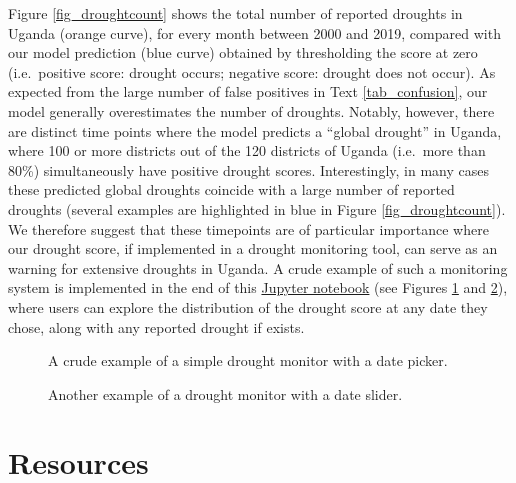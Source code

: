 \documentclass[10pt,parskip=half,
toc=sectionentrywithdots,
bibliography=totocnumbered,
captions=tableheading,numbers=noendperiod]{scrartcl}
\begin{document}
Figure \ref{fig_droughtcount} shows the total number of reported
droughts in Uganda (orange curve), for every month between 2000 and
2019, compared with our model prediction (blue curve) obtained by
thresholding the score at zero (i.e.~positive score: drought occurs;
negative score: drought does not occur). As expected from the large
number of false positives in Text \ref{tab_confusion}, our model
generally overestimates the number of droughts. Notably, however, there
are distinct time points where the model predicts a ``global drought''
in Uganda, where 100 or more districts out of the 120 districts of
Uganda (i.e.~more than 80\%) simultaneously have positive drought
scores. Interestingly, in many cases these predicted global droughts
coincide with a large number of reported droughts (several examples are
highlighted in blue in Figure \ref{fig_droughtcount}). We therefore
suggest that these timepoints are of particular importance where our
drought score, if implemented in a drought monitoring tool, can serve as
an warning for extensive droughts in Uganda. A crude example of such a
monitoring system is implemented in the end of this
\href{https://github.com/rodekruis/Drought_IBF/blob/master/Model\%20Event\%20Data/Uganda_logit_model.ipynb}{Jupyter
notebook} (see Figures \ref{fig_monitor} and \ref{fig_monitor_2}), where
users can explore the distribution of the drought score at any date they
chose, along with any reported drought if exists.

\begin{figure}[H]
\hypertarget{fig_monitor}{%
\begin{center}
\end{center}
\caption{A crude example of a simple drought monitor with a date picker.}\label{fig_monitor}
}
\end{figure}

\begin{figure}[H]
\hypertarget{fig_monitor_2}{%
\begin{center}
\end{center}
\caption{Another example of a drought monitor with a date slider.}\label{fig_monitor_2}
}
\end{figure}

\hypertarget{resources}{%
\section{Resources}\label{resources}}
\end{document}
